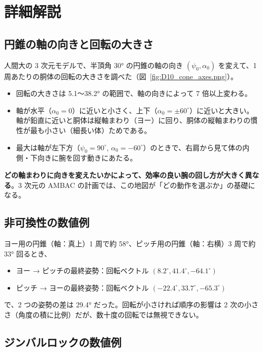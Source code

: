 \section{詳細解説}

\subsection{円錐の軸の向きと回転の大きさ}

人間大の 3 次元モデルで、半頂角 30° の円錐の軸の向き $(\psi_0, \alpha_0)$ を変えて、1 周あたりの胴体の回転の大きさを調べた（図~\ref{fig:D10_cone_axes.png}）。
\begin{itemize}
\item 回転の大きさは 5.1〜38.2° の範囲で、軸の向きによって 7 倍以上変わる。
\item 軸が水平（$\alpha_0=0$）に近いと小さく、上下（$\alpha_0=\pm60^\circ$）に近いと大きい。
  軸が鉛直に近いと胴体は縦軸まわり（ヨー）に回り、胴体の縦軸まわりの慣性が最も小さい（細長い体）ためである。
\item 最大は軸が左下方（$\psi_0=90^\circ$, $\alpha_0=-60^\circ$）のときで、右肩から見て体の内側・下向きに腕を回す動きにあたる。
\end{itemize}
\textbf{どの軸まわりに向きを変えたいかによって、効率の良い腕の回し方が大きく異なる}。3 次元の AMBAC の計画では、この地図が「どの動作を選ぶか」の基礎になる。


\subsection{非可換性の数値例}

ヨー用の円錐（軸：真上）1 周で約 58°、ピッチ用の円錐（軸：右横）3 周で約 33° 回るとき、
\begin{itemize}
\item ヨー → ピッチの最終姿勢：回転ベクトル $(8.2^\circ, 41.4^\circ, -64.1^\circ)$
\item ピッチ → ヨーの最終姿勢：回転ベクトル $(-22.4^\circ, 33.7^\circ, -65.3^\circ)$
\end{itemize}
で、2 つの姿勢の差は 29.4° だった。回転が小さければ順序の影響は 2 次の小ささ（角度の積に比例）だが、数十度の回転では無視できない。

\subsection{ジンバルロックの数値例}

